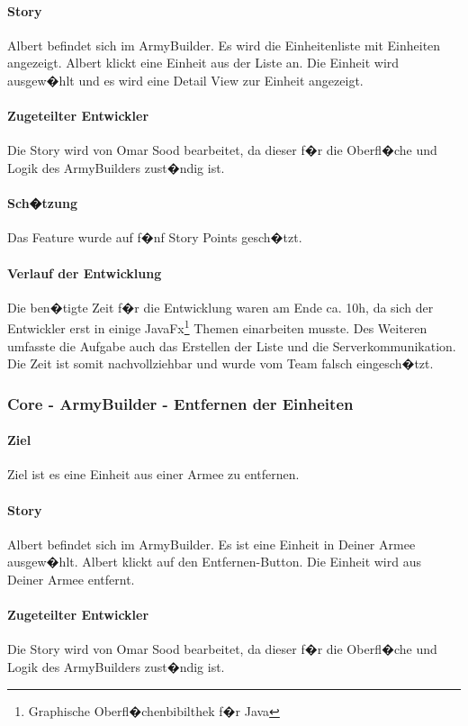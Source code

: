 \documentclass[12pt, titlepage]{scrartcl}
\begin{document}
		\paragraph{Story} Albert befindet sich im ArmyBuilder. Es wird die Einheitenliste mit Einheiten angezeigt. Albert klickt eine Einheit aus der Liste an. Die Einheit wird ausgew�hlt und es wird eine Detail View zur Einheit angezeigt.
		\paragraph{Zugeteilter Entwickler} Die Story wird von Omar Sood bearbeitet, da dieser f�r die Oberfl�che und Logik des ArmyBuilders zust�ndig ist.
		\paragraph{Sch�tzung}
		Das Feature wurde auf f�nf Story Points gesch�tzt.
		\paragraph{Verlauf der Entwicklung} Die ben�tigte Zeit f�r die Entwicklung waren am Ende ca. 10h, da sich der Entwickler erst in einige JavaFx\footnote{Graphische Oberfl�chenbibilthek f�r Java} Themen einarbeiten musste. Des Weiteren umfasste die Aufgabe auch das Erstellen der Liste und die Serverkommunikation. Die Zeit ist somit nachvollziehbar und wurde vom Team falsch eingesch�tzt.
		
		\subsubsection{Core - ArmyBuilder - Entfernen der Einheiten}
		\paragraph{Ziel} Ziel ist es eine Einheit aus einer Armee zu entfernen.
		\paragraph{Story} Albert befindet sich im ArmyBuilder. Es ist eine Einheit in \glqq Deiner Armee \grqq ausgew�hlt. Albert klickt auf den Entfernen-Button. Die Einheit wird aus \glqq Deiner Armee \grqq entfernt.
		\paragraph{Zugeteilter Entwickler} Die Story wird von Omar Sood bearbeitet, da dieser f�r die Oberfl�che und Logik des ArmyBuilders zust�ndig ist.
\end{document}
